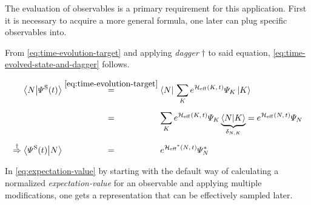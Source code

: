 The evaluation of observables is a primary requirement for this application. 
First it is necessary to acquire a more general formula, one later can plug specific observables into.

From \autoref{eq:time-evolution-target} and applying \emph{dagger} $\dagger$ to said equation, \autoref{eq:time-evolved-state-and-dagger} follows.


\begin{equation}
    \label{eq:time-evolved-state-and-dagger}
    \begin{split}
        \braketHelper{N}{\psiOfT[\schroedingerPicture]} &\stackrel{\ref{eq:time-evolution-target}}{=} \braN{} \lsum[K] e^{\HeffOft[K]} \psiN[K] \ketN[K]{}\\
        & \stackrel{\phantom{\ref{eq:time-evolution-target}}}{=} 
        \lsum[K]   e^{\HeffOft[K]} \psiN[K] \underbrace{\braketHelper{N}{K}}_\text{$\delta_{N,K}$} = e^{\HeffOft} \psiN{} \\
        \stackrel{\dagger}{\Rightarrow} \braketHelper{\psiOfT[\schroedingerPicture]}{N} &\stackrel{\phantom{\ref{eq:time-evolution-target}}}{=} e^{\HeffOftStar} \psiNStar
    \end{split}
\end{equation}

In \autoref{eq:expectation-value} by starting with the default way of calculating a normalized \emph{expectation-value} for an observable \ObservableOp \cite{monteCarloObservableSampling} and applying multiple modifications, one gets a representation that can be effectively sampled later. 

